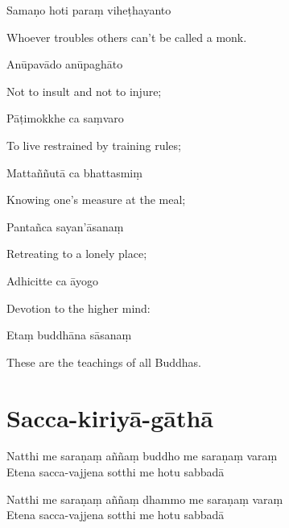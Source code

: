 Samaṇo hoti paraṃ viheṭhayanto

\begin{english}
  Whoever troubles others can't be called a monk.
\end{english}

Anūpavādo anūpaghāto

\begin{english}
  Not to insult and not to injure;
\end{english}

Pāṭimokkhe ca saṃvaro

\begin{english}
  To live restrained by training rules;
\end{english}

Mattaññutā ca bhattasmiṃ

\begin{english}
  Knowing one's measure at the meal;
\end{english}

Pantañca sayan'āsanaṃ

\begin{english}
  Retreating to a lonely place;
\end{english}

Adhicitte ca āyogo

\begin{english}
  Devotion to the higher mind:
\end{english}

Etaṃ buddhāna sāsanaṃ

\begin{english}
  These are the teachings of all Buddhas.
\end{english}


\section{Sacca-kiriyā-gāthā}

\begin{leader}
\end{leader}


Natthi me saraṇaṃ aññaṃ buddho me saraṇaṃ varaṃ\\
Etena sacca-vajjena sotthi me hotu sabbadā

Natthi me saraṇaṃ aññaṃ dhammo me saraṇaṃ varaṃ\\
Etena sacca-vajjena sotthi me hotu sabbadā

